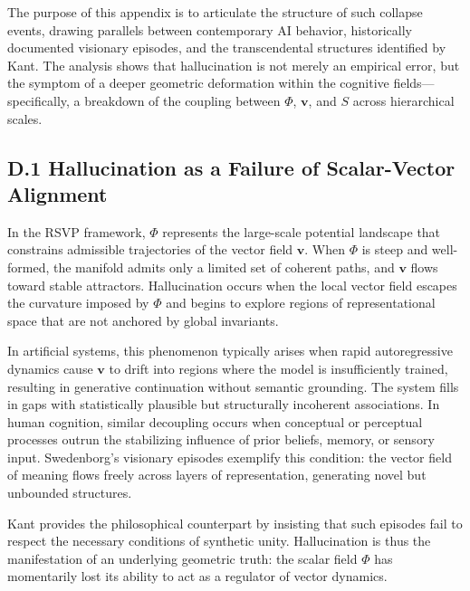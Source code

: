 \documentclass[12pt]{article}
\begin{document}
The purpose of this appendix is to articulate the structure of such collapse 
events, drawing parallels between contemporary AI behavior, historically 
documented visionary episodes, and the transcendental structures identified 
by Kant. The analysis shows that hallucination is not merely an empirical 
error, but the symptom of a deeper geometric deformation within the cognitive 
fields---specifically, a breakdown of the coupling between $\Phi$, 
$\mathbf{v}$, and $S$ across hierarchical scales.

\subsection*{D.1 Hallucination as a Failure of Scalar-Vector Alignment}

In the RSVP framework, $\Phi$ represents the large-scale potential landscape 
that constrains admissible trajectories of the vector field $\mathbf{v}$.  
When $\Phi$ is steep and well-formed, the manifold admits only a limited set 
of coherent paths, and $\mathbf{v}$ flows toward stable attractors.  
Hallucination occurs when the local vector field escapes the curvature imposed 
by $\Phi$ and begins to explore regions of representational space that are not 
anchored by global invariants.

In artificial systems, this phenomenon typically arises when rapid 
autoregressive dynamics cause $\mathbf{v}$ to drift into regions where the 
model is insufficiently trained, resulting in generative continuation without 
semantic grounding. The system fills in gaps with statistically plausible but 
structurally incoherent associations. In human cognition, similar decoupling 
occurs when conceptual or perceptual processes outrun the stabilizing 
influence of prior beliefs, memory, or sensory input. Swedenborg’s visionary 
episodes exemplify this condition: the vector field of meaning flows freely 
across layers of representation, generating novel but unbounded structures.

Kant provides the philosophical counterpart by insisting that such episodes 
fail to respect the necessary conditions of synthetic unity. Hallucination is 
thus the manifestation of an underlying geometric truth: the scalar field 
$\Phi$ has momentarily lost its ability to act as a regulator of vector 
dynamics.

\end{document}
